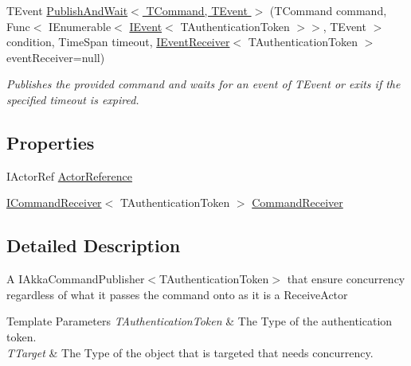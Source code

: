 \begin{DoxyCompactItemize}
T\+Event \hyperlink{classCqrs_1_1Akka_1_1Commands_1_1ConcurrentAkkaCommandPublisher_a80ae82e4812d7e52eafae1dcbcd4404a_a80ae82e4812d7e52eafae1dcbcd4404a}{Publish\+And\+Wait$<$ T\+Command, T\+Event $>$} (T\+Command command, Func$<$ I\+Enumerable$<$ \hyperlink{interfaceCqrs_1_1Events_1_1IEvent}{I\+Event}$<$ T\+Authentication\+Token $>$$>$, T\+Event $>$ condition, Time\+Span timeout, \hyperlink{interfaceCqrs_1_1Events_1_1IEventReceiver}{I\+Event\+Receiver}$<$ T\+Authentication\+Token $>$ event\+Receiver=null)
\begin{DoxyCompactList}\small\item\em Publishes the provided {\itshape command}  and waits for an event of {\itshape T\+Event}  or exits if the specified timeout is expired. \end{DoxyCompactList}\end{DoxyCompactItemize}
\subsection*{Properties}
\begin{DoxyCompactItemize}
\item 
I\+Actor\+Ref \hyperlink{classCqrs_1_1Akka_1_1Commands_1_1ConcurrentAkkaCommandPublisher_a3ad0660fe46ca4b238a7e2a8cecad19c_a3ad0660fe46ca4b238a7e2a8cecad19c}{Actor\+Reference}
\item 
\hyperlink{interfaceCqrs_1_1Commands_1_1ICommandReceiver}{I\+Command\+Receiver}$<$ T\+Authentication\+Token $>$ \hyperlink{classCqrs_1_1Akka_1_1Commands_1_1ConcurrentAkkaCommandPublisher_a000c2cddf20768b5feec16a8f4e02587_a000c2cddf20768b5feec16a8f4e02587}{Command\+Receiver}
\end{DoxyCompactItemize}


\subsection{Detailed Description}
A I\+Akka\+Command\+Publisher$<$\+T\+Authentication\+Token$>$ that ensure concurrency regardless of what it passes the command onto as it is a Receive\+Actor 


\begin{DoxyTemplParams}{Template Parameters}
{\em T\+Authentication\+Token} & The Type of the authentication token.\\
\hline
{\em T\+Target} & The Type of the object that is targeted that needs concurrency.\\
\hline
\end{DoxyTemplParams}


